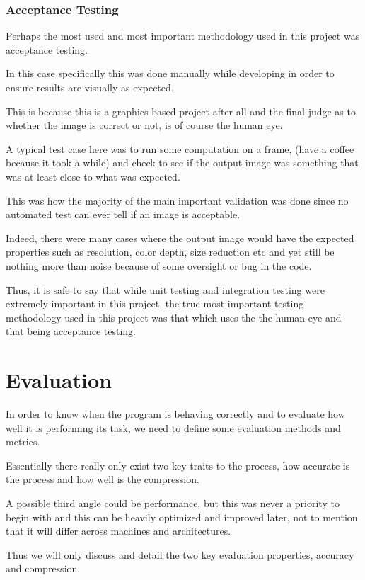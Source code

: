 \documentclass[12pt]{article}
\newcommand{\sentence}{} %
\begin{document}
    \subsubsection{Acceptance Testing}\label{subsubsec:acceptance-testing}

    \tab
    Perhaps the most used and most important methodology used in this project was acceptance testing.
    \sentence
    In this case specifically this was done manually while developing in order to ensure results are visually as
    expected.
    \sentence
    This is because this is a graphics based project after all and the final judge as to whether the image is correct
    or not, is of course the human eye.
    \sentence
    A typical test case here was to run some computation on a frame, (have a coffee because it took a while) and
    check to see if the output image was something that was at least close to what was expected.
    \sentence
    This was how the majority of the main important validation was done since no automated test can ever tell if an
    image is acceptable.
    \sentence
    Indeed, there were many cases where the output image would have the expected properties such as resolution, color
    depth, size reduction etc and yet still be nothing more than noise because of some oversight or bug in the code.
    \sentence
    Thus, it is safe to say that while unit testing and integration testing were extremely important in this project,
    the true most important testing methodology used in this project was that which uses the the human eye and that
    being acceptance testing.

    \pagebreak


    \section{Evaluation}\label{sec:evaluation}

    \tab
    In order to know when the program is behaving correctly and to evaluate how well it is performing its task, we
    need to define some evaluation methods and metrics.
    \sentence
    Essentially there really only exist two key traits to the process, how accurate is the process and how well is
    the compression.
    \sentence
    A possible third angle could be performance, but this was never a priority to begin with and this can be heavily
    optimized and improved later, not to mention that it will differ across machines and architectures.
    \sentence
    Thus we will only discuss and detail the two key evaluation properties, accuracy and compression.
\end{document}

